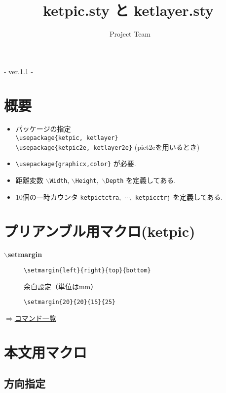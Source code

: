 \documentclass[a4j,12pt,dvipdfmx]{ujarticle}
\newcommand{\bs}{$\backslash$}
\newenvironment{cmd}[2]{%
\hypertarget{#2}{}
\begin{center}{\bf\large #1}\end{center}
\begin{description}
}{
\end{description}
\begin{flushright} \hyperlink{functionlist}{$\Rightarrow$コマンド一覧}\end{flushright}
}
\newcommand{\itemketj}[1]{
\item[\Ltab{15mm}{#1}]
}
\begin{document}
\title{{\bf\huge ketpic.sty と ketlayer.sty}}
\author{\ketcindy\ Project Team}
\maketitle

\begin{center}  - ver.1.1 -\end{center}


\section{概要}

\begin{itemize}
\item パッケージの指定\\
\quad\verb|\usepackage{ketpic, ketlayer}|\\
\quad\verb|\usepackage{ketpic2e, ketlayer2e}| (pict2eを用いるとき)
\item \verb|\usepackage{graphicx,color}| が必要.
\item 距離変数 \bs\verb|Width|, \bs\verb|Height|,\ \bs\verb|Depth| を定義してある.
\item 10個の一時カウンタ \verb|ketpictctra|,\ $\cdots$,\ \verb|ketpicctrj| を定義してある.

\end{itemize}

\section{プリアンブル用マクロ(ketpic)}
\vspace{\baselineskip}
\begin{cmd}{\bs setmargin}{setmargin}
\itemketj{使用法}\verb|\setmargin{left}{right}{top}{bottom}|
\itemketj{説明}余白設定（単位はmm）
\itemketj{例}\verb|\setmargin{20}{20}{15}{25}|
\end{cmd}

\section{本文用マクロ}

\subsection{方向指定}
\end{document}
